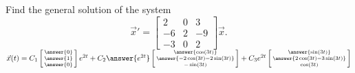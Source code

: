 \documentclass{ximera}
\begin{document}
\begin{exercise}%
    Find the general solution of the system
    \begin{equation*}
        {\vec{x}}' = 
        \begin{bmatrix} 
            2 & 0 & 3 \\ 
            -6 & 2 & -9 \\ 
            -3 & 0 & 2 
        \end{bmatrix} \vec{x}.
    \end{equation*}
    $\vec{x}(t) = C_1\left[\begin{smallmatrix} \answer{0} \\ \answer{1} \\ \answer{0} \end{smallmatrix}\right]e^{2t} + C_2\answer{e^{2t}}\left[\begin{smallmatrix} \answer{\cos(3t)} \\ \answer{-2\cos(3t) - 2\sin(3t)}\\ -\sin(3t) \end{smallmatrix}\right] + C_3e^{2t}\left[\begin{smallmatrix} \answer{\sin(3t)} \\ \answer{2\cos(3t) - 3\sin(3t)} \\ \cos(3t) \end{smallmatrix}\right]$
\end{exercise}
\end{document}
